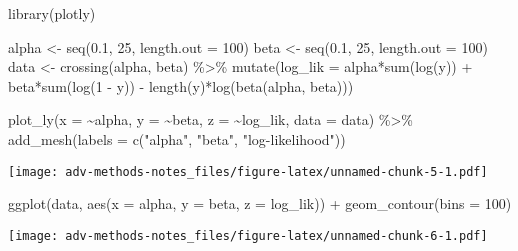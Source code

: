 \documentclass[
]{book}
\newenvironment{Shaded}{\begin{snugshade}}{\end{snugshade}}
\newcommand{\AttributeTok}[1]{\textcolor[rgb]{0.77,0.63,0.00}{#1}}
\newcommand{\DecValTok}[1]{\textcolor[rgb]{0.00,0.00,0.81}{#1}}
\newcommand{\FloatTok}[1]{\textcolor[rgb]{0.00,0.00,0.81}{#1}}
\newcommand{\FunctionTok}[1]{\textcolor[rgb]{0.00,0.00,0.00}{#1}}
\newcommand{\NormalTok}[1]{#1}
\newcommand{\OtherTok}[1]{\textcolor[rgb]{0.56,0.35,0.01}{#1}}
\newcommand{\SpecialCharTok}[1]{\textcolor[rgb]{0.00,0.00,0.00}{#1}}
\newcommand{\StringTok}[1]{\textcolor[rgb]{0.31,0.60,0.02}{#1}}
\begin{document}
\begin{Shaded}
\begin{Highlighting}[]
\FunctionTok{library}\NormalTok{(plotly)}

\NormalTok{alpha }\OtherTok{\textless{}{-}} \FunctionTok{seq}\NormalTok{(}\FloatTok{0.1}\NormalTok{, }\DecValTok{25}\NormalTok{, }\AttributeTok{length.out =} \DecValTok{100}\NormalTok{)}
\NormalTok{beta  }\OtherTok{\textless{}{-}} \FunctionTok{seq}\NormalTok{(}\FloatTok{0.1}\NormalTok{, }\DecValTok{25}\NormalTok{, }\AttributeTok{length.out =} \DecValTok{100}\NormalTok{)}
\NormalTok{data }\OtherTok{\textless{}{-}} \FunctionTok{crossing}\NormalTok{(alpha, beta) }\SpecialCharTok{\%\textgreater{}\%}
  \FunctionTok{mutate}\NormalTok{(}\AttributeTok{log\_lik =}\NormalTok{ alpha}\SpecialCharTok{*}\FunctionTok{sum}\NormalTok{(}\FunctionTok{log}\NormalTok{(y)) }\SpecialCharTok{+}\NormalTok{ beta}\SpecialCharTok{*}\FunctionTok{sum}\NormalTok{(}\FunctionTok{log}\NormalTok{(}\DecValTok{1} \SpecialCharTok{{-}}\NormalTok{ y)) }\SpecialCharTok{{-}} 
           \FunctionTok{length}\NormalTok{(y)}\SpecialCharTok{*}\FunctionTok{log}\NormalTok{(}\FunctionTok{beta}\NormalTok{(alpha, beta)))}

\FunctionTok{plot\_ly}\NormalTok{(}\AttributeTok{x =} \SpecialCharTok{\textasciitilde{}}\NormalTok{alpha, }\AttributeTok{y =} \SpecialCharTok{\textasciitilde{}}\NormalTok{beta, }\AttributeTok{z =} \SpecialCharTok{\textasciitilde{}}\NormalTok{log\_lik, }\AttributeTok{data =}\NormalTok{ data) }\SpecialCharTok{\%\textgreater{}\%}
  \FunctionTok{add\_mesh}\NormalTok{(}\AttributeTok{labels =} \FunctionTok{c}\NormalTok{(}\StringTok{"alpha"}\NormalTok{, }\StringTok{"beta"}\NormalTok{, }\StringTok{"log{-}likelihood"}\NormalTok{))}
\end{Highlighting}
\end{Shaded}

\texttt{[image: adv-methods-notes\_files/figure-latex/unnamed-chunk-5-1.pdf]}

\begin{Shaded}
\begin{Highlighting}[]
\FunctionTok{ggplot}\NormalTok{(data, }\FunctionTok{aes}\NormalTok{(}\AttributeTok{x =}\NormalTok{ alpha, }\AttributeTok{y =}\NormalTok{ beta, }\AttributeTok{z =}\NormalTok{ log\_lik)) }\SpecialCharTok{+} 
  \FunctionTok{geom\_contour}\NormalTok{(}\AttributeTok{bins =} \DecValTok{100}\NormalTok{)}
\end{Highlighting}
\end{Shaded}

\texttt{[image: adv-methods-notes\_files/figure-latex/unnamed-chunk-6-1.pdf]}
\end{document}
